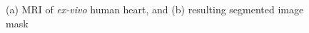 \begin{figure}[ht]
\centering
{}
%
\caption{(a) MRI of \textit{ex-vivo} human heart, and (b) resulting segmented image mask}
\label{fig:seg}
\end{figure}